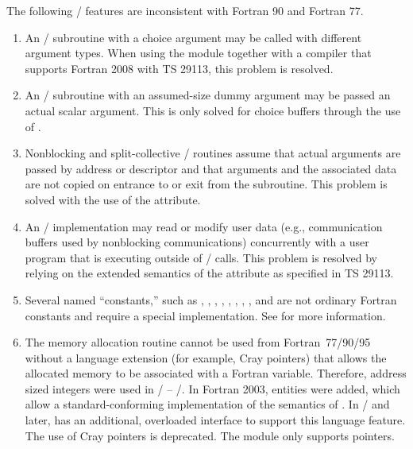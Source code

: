 The following \MPI/ features are inconsistent with Fortran 90 and Fortran 77.
\begin{enumerate}
\item An \MPI/ subroutine with a choice argument may be
called with different argument types.
When using the  module
together with a compiler that supports Fortran 2008 with
TS 29113, this problem is resolved.
\item An \MPI/ subroutine with an assumed-size dummy argument may
be passed an actual scalar argument.
This is only solved for choice buffers through the use of .
\item Nonblocking and split-collective \MPI/ routines assume that actual arguments are
passed by address or descriptor and that arguments and the associated data are not copied on
entrance to or exit from the subroutine.
This problem is solved with the use of the
 attribute.
\item An \MPI/ implementation may read or modify user data (e.g.,
communication buffers used by nonblocking communications) concurrently
with a user program that is executing outside
of \MPI/ calls.
This problem is resolved by relying on the extended
semantics of the  attribute as specified in
TS 29113.
\item Several named ``constants,'' such as ,
  ,
, ,
,
,
,
, and
are not ordinary Fortran constants and require a special
implementation. See  for more information.
\item The memory allocation routine  cannot
be used from\flushline
Fortran~77/90/95
without a language extension (for example, Cray pointers) that allows
the allocated memory to be associated with a Fortran variable.
Therefore, address sized integers were used in \MPIIIDOTO/ -- \MPIIIDOTII/.
In Fortran 2003,  entities were added,
which allow a standard-conforming implementation of the semantics of .
In \MPIIIIDOTO/ and later, 
has an additional, overloaded interface to support this
language feature. The use of Cray pointers is deprecated.
The  module only supports  pointers.
\end{enumerate}

